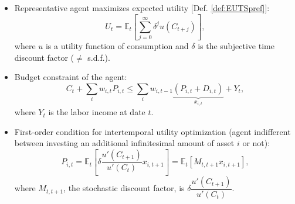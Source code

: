 \begin{frame}
\begin{footnotesize}
\begin{itemize}
	\item Representative agent maximizes expected utility [Def. \ref{def:EUTSpref}]:
	$$
	U_t = \mathbb{E}_t \left[ \sum_{j=0}^\infty \delta^j u(C_{t+j}) \right],
	$$
	where $u$ is a utility function of consumption and $\delta$ is the subjective time discount factor ($\ne$ s.d.f.).
	\item Budget constraint of the agent:
	$$
	C_t + \sum_i w_{i,t} P_{i,t} \le \sum_i w_{i,t-1}\underbrace{(P_{i,t}+D_{i,t})}_{x_{i,t}} + Y_t,
	$$
	where $Y_t$ is the labor income at date $t$.
	\item First-order condition for intertemporal utility optimization (agent indifferent between investing an additional infinitesimal amount of asset $i$ or not):
	\begin{equation}\label{eq:pricingcapm}
	P_{i,t} = \mathbb{E}_t \left[ \delta \frac{u'(C_{t+1})}{u'(C_{t})} x_{i,t+1} \right] = \mathbb{E}_t \left[ M_{t,t+1} x_{i,t+1} \right],
	\end{equation}
	where $M_{t,t+1}$, the {\color{blue}stochastic discount factor}, is $\delta \dfrac{u'(C_{t+1})}{u'(C_{t})}$.
\end{itemize}
\end{footnotesize}
\end{frame}

